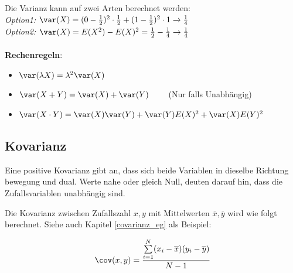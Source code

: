 \noindent Die Varianz kann auf zwei Arten berechnet werden:\\
\textit{Option1:} $\var(X) = (0 - \frac{1}{2})^2 \cdot \frac{1}{2} + (1 - \frac{1}{2})^2 \cdot 1 \xrightarrow{} \frac{1}{4}$\\
\textit{Option2:} $\var(X) = E(X^2) - E(X)^2 = \frac{1}{2} - \frac{1}{4} \rightarrow \frac{1}{4}$
\\ ~\\
\noindent\textbf{Rechenregeln}:
\begin{itemize}[nosep]
	\item $\var(\lambda X) = \lambda^2\var(X)$
	\item $\var(X + Y) = \var(X) + \var(Y) \qquad$ (Nur falls Unabhängig)
	\item $\var(X\cdot Y) = \var(X)\var(Y) + \var(Y)E(X)^2 + \var(X)E(Y)^2$
\end{itemize}

\subsection{Kovarianz}
Eine positive Kovarianz gibt an, dass sich beide Variablen in dieselbe Richtung bewegung und dual. Werte nahe oder gleich Null, deuten darauf hin, dass die Zufallsvariablen unabhängig sind.

Die Kovarianz zwischen Zufallszahl $x,y$ mit Mittelwerten $\overline{x}, \overline{y}$ wird wie folgt berechnet. Siehe auch Kapitel \ref{covarianz_eg} als Beispiel:

\[
\cov(x,y) = \frac{\sum\limits_{i=1}^{N}(x_i - \overline{x})(y_i - \overline{y})}{N-1}
\]

